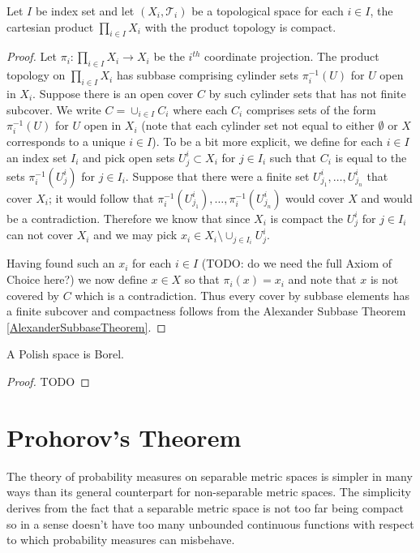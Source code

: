 \begin{thm}\label{Tychonoff}Let $I$ be index set
  and let $(X_i,  \mathcal{T}_i)$ be a topological space for each $i \in I$, the
  cartesian product $\prod_{i \in I} X_i$ with the product topology is
  compact.
\end{thm}
\begin{proof}
Let $\pi_i : \prod_{i \in I} X_i  \to X_i$ be the $i^{th}$ coordinate projection.  The product topology on $\prod_{i \in I} X_i$ has subbase comprising cylinder sets $\pi_i^{-1}(U)$ for $U$ open in $X_i$.  Suppose there is an open cover $C$ by such cylinder sets that has not finite subcover.  We write $C = \cup_{i \in I} C_i$ where each $C_i$ comprises sets of the form $\pi_i^{-1}(U)$ for $U$ open in $X_i$ (note that each cylinder set not equal to either $\emptyset$ or $X$ corresponds to a unique $i \in I$).  To be a bit more explicit, we define for each $i \in I$ an index set $I_i$ and pick open
sets $U^i_j \subset X_i$ for $j \in I_i$ such that $C_i$ is equal to the sets $\pi_i^{-1}(U^i_j)$ for $j \in I_i$.  Suppose that there were a finite set $U^i_{j_1}, \dotsc, U^i_{j_n}$ that cover $X_i$; it would follow that $\pi_i^{-1}(U^i_{j_1}), \dotsc, \pi_i^{-1}(U^i_{j_n})$ would cover $X$ and would be a contradiction.  Therefore we know that since $X_i$ is compact the $U^i_j$ for $j \in I_i$ can not cover $X_i$ and we may pick $x_i \in X_i \setminus \cup_{j \in I_i} U^i_j$.  

Having found such an $x_i$ for each $i \in I$ (TODO: do we need the full Axiom of Choice here?)  we now define $x \in X$ so that $\pi_i(x) = x_i$ and note that $x$ is not covered by $C$ which is a contradiction.  Thus every cover by subbase elements has a finite subcover and compactness follows from the Alexander Subbase Theorem \ref{AlexanderSubbaseTheorem}.
\end{proof}

\begin{thm}\label{PolishImpliesBorel}A Polish space is Borel.
\end{thm}
\begin{proof}
TODO
\end{proof}

\section{Prohorov's Theorem}

The theory of probability measures on separable metric spaces is simpler in many ways than its general counterpart 
for non-separable metric spaces. The simplicity derives from the fact that a separable metric space is not too far being compact
so in a sense doesn't have too many unbounded continuous functions with respect to which probability measures can misbehave.

